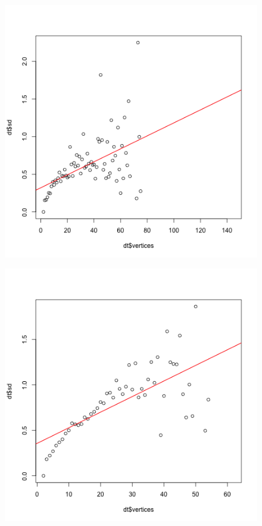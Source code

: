 \documentclass[paper=a4, fontsize=11pt]{scrartcl} %
\begin{document}
\begin{figure}
\centering
\begin{minipage}{.5\textwidth}
  \centering
  \includegraphics[width=\linewidth]{homoscedasticity_Italian.png}
  \label{fig:19}
\end{minipage}%
\begin{minipage}{.5\textwidth}
  \centering
  \includegraphics[width=\linewidth]{homoscedasticity_Turkish.png}
  \label{fig:20}
\end{minipage}
\end{figure}
\end{document}
